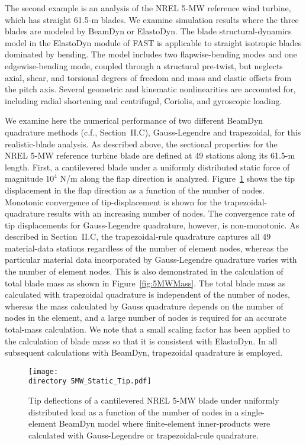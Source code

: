 \documentclass{aiaa-tc}
\def\directory{EPSF/}
\begin{document}
The second example is an analysis of the NREL 5-MW reference wind turbine\cite{Jonkman-etal:2009}, which has straight 61.5-m blades.  
We examine simulation results where the three blades are modeled by BeamDyn or ElastoDyn.
The blade structural-dynamics model in the ElastoDyn module of FAST is applicable to straight isotropic blades dominated by bending.  The model includes two flapwise-bending modes and one edgewise-bending mode, coupled through a structural pre-twist, but neglects axial, shear, and torsional degrees of freedom and mass and elastic offsets from the pitch axis.  Several geometric and kinematic nonlinearities are accounted for, including radial shortening and centrifugal, Coriolis, and gyroscopic loading.

We examine here the numerical performance of two different BeamDyn quadrature methods (c.f., Section~II.C), Gauss-Legendre and trapezoidal, for this realistic-blade analysis.  
As described above, the sectional properties for the NREL 5-MW reference turbine blade are defined at 49 stations along its 61.5-m length.  
First, a cantilevered blade under a uniformly distributed static force of magnitude $10^4$ N/m along the flap direction is analyzed.
Figure~\ref{fig:5MWStaticTip} shows the tip displacement in the flap direction as a function of the number of nodes.  
Monotonic convergence of tip-displacement is shown for the trapezoidal-quadrature results with an increasing number of nodes.  
The convergence rate of tip displacements for Gauss-Legendre quadrature, however, is non-monotonic.  As described in Section~II.C, the trapezoidal-rule quadrature captures all 49 material-data stations regardless of the number of element nodes, whereas the particular material data incorporated by Gauss-Legendre quadrature varies with the number of element nodes.  
This is also demonstrated in the calculation of total blade mass as shown in Figure~\ref{fig:5MWMass}.  
The total blade mass as calculated with trapezoidal quadrature is independent of the number of nodes, whereas the mass calculated by Gauss quadrature  depends on the number of nodes in the
element, and a large number of nodes is required for an accurate total-mass
calculation.  
We note that a small scaling factor has been applied to the calculation of blade mass so that it is consistent with ElastoDyn.  
In all subsequent calculations with BeamDyn, trapezoidal quadrature is employed. 
\begin{figure}
\centering
\texttt{[image: \\directory 5MW\_Static\_Tip.pdf]}
\caption{Tip deflections of a cantilevered NREL 5-MW blade under uniformly distributed load as a function of the number of nodes in a single-element BeamDyn model where finite-element inner-products were calculated with Gauss-Legendre or trapezoidal-rule quadrature.} 
\label{fig:5MWStaticTip}
\end{figure}
\end{document}
